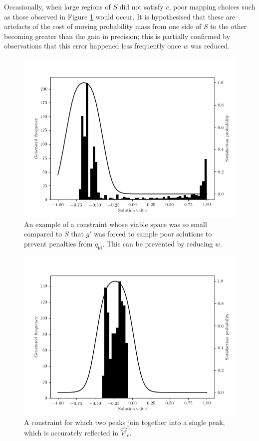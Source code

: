 \documentclass[../../main.tex]{subfiles}
\begin{document}
Occasionally, when large regions of $S$ did not satisfy $c$, poor mapping choices such as those observed in Figure \ref{fig:embeddedConstraintTooSparse} would occur.
It is hypothesised that these are artefacts of the cost of moving probability mass from one side of $S$ to the other becoming greater than the gain in precision; this is partially confirmed by observations that this error happened less frequently once $w$ was reduced.
\begin{figure}[H]
    \begin{center}
    \includegraphics[width=\textwidth]{embeddedConstraint4}
    \caption{
        An example of a constraint whose viable space was so small compared to $S$ that $g'$ was forced to sample poor solutions to prevent penalties from $q_\text{id}$.
        This can be prevented by reducing $w$.
    }
    \label{fig:embeddedConstraintTooSparse}
    \end{center}
\end{figure}
\begin{figure}[H]
    \begin{center}
    \includegraphics[width=\textwidth]{embeddedConstraint7}
    \caption{
        A constraint for which two peaks join together into a single peak, which is accurately reflected in $\hat{V'_c}$.
    }
    \label{fig:embeddedConstraintJoinedModes}
    \end{center}
\end{figure}
\end{document}
